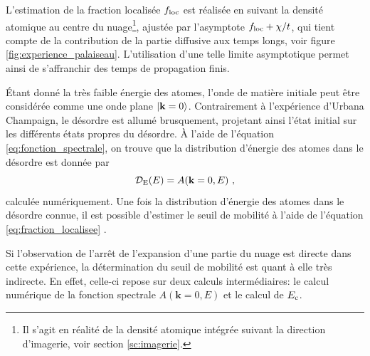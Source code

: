 L'estimation de la fraction localisée $f_{\mathrm{loc}}$ est réalisée en suivant la densité atomique au centre du nuage\footnote{Il s'agit en réalité de la densité atomique intégrée suivant la direction d'imagerie, voir section \ref{sc:imagerie}.}, ajustée par l'asymptote $f_{\mathrm{loc}}+\chi/t$, qui tient compte de la contribution de la partie diffusive aux temps longs, voir figure \ref{fig:experience_palaiseau}. L'utilisation d'une telle limite asymptotique permet ainsi de s'affranchir des temps de propagation finis.


Étant donné la très faible énergie des atomes, l'onde de matière initiale peut être considérée comme une onde plane $\left| \mathbf{k}=0 \right\rangle$. Contrairement à l'expérience d'Urbana Champaign, le désordre est allumé brusquement, projetant ainsi l'état initial sur les différents états propres du désordre. À l'aide de l'équation \ref{eq:fonction_spectrale}, on trouve que la distribution d'énergie des atomes dans le désordre est donnée par 
\begin{equation}
\mathcal{D}_{\mathrm{E}}(E) = A(\mathbf{k}=0,E) \text{ ,}
\end{equation}
calculée numériquement. Une fois la distribution d'énergie des atomes dans le désordre connue, il est possible d'estimer le seuil de mobilité à l'aide de l'équation \ref{eq:fraction_localisee} \citep{piraud2012localisation}.

Si l'observation de l'arrêt de l'expansion d'une partie du nuage est directe dans cette expérience, la détermination du seuil de mobilité est quant à elle très indirecte. En effet, celle-ci repose sur deux calculs intermédiaires: le calcul numérique de la fonction spectrale $A(\mathbf{k}=0,E)$ et le calcul de $E_{\mathrm{c}}$. 



